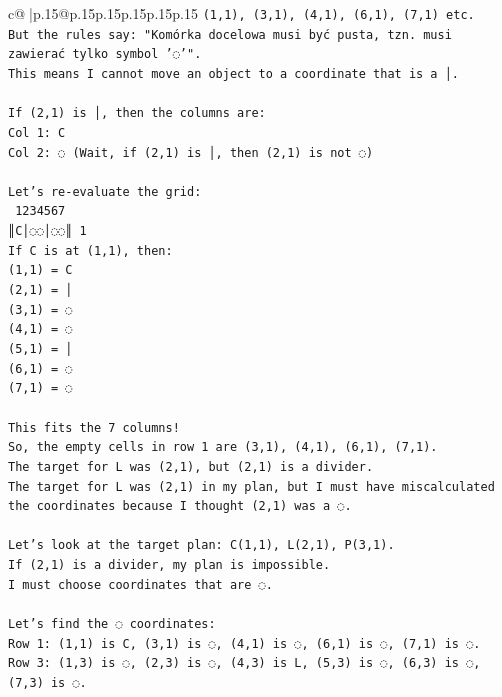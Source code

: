 \documentclass{article}
\begin{document}
{\begin{supertabular}{c@{$\;$}|p{.15\linewidth}@{}p{.15\linewidth}p{.15\linewidth}p{.15\linewidth}p{.15\linewidth}p{.15\linewidth}}
{{{\texttt{(1,1), (3,1), (4,1), (6,1), (7,1) etc.} \\
\texttt{But the rules say: "Komórka docelowa musi być pusta, tzn. musi zawierać tylko symbol '◌'".} \\
\texttt{This means I cannot move an object to a coordinate that is a │.} \\
\\ 
\texttt{If (2,1) is │, then the columns are:} \\
\texttt{Col 1: C} \\
\texttt{Col 2: ◌ (Wait, if (2,1) is │, then (2,1) is not ◌)} \\
\\ 
\texttt{Let's re{-}evaluate the grid:} \\
\texttt{ 1234567} \\
\texttt{║C│◌◌│◌◌║ 1} \\
\texttt{If C is at (1,1), then:} \\
\texttt{(1,1) = C} \\
\texttt{(2,1) = │} \\
\texttt{(3,1) = ◌} \\
\texttt{(4,1) = ◌} \\
\texttt{(5,1) = │} \\
\texttt{(6,1) = ◌} \\
\texttt{(7,1) = ◌} \\
\\ 
\texttt{This fits the 7 columns!} \\
\texttt{So, the empty cells in row 1 are (3,1), (4,1), (6,1), (7,1).} \\
\texttt{The target for L was (2,1), but (2,1) is a divider.} \\
\texttt{The target for L was (2,1) in my plan, but I must have miscalculated the coordinates because I thought (2,1) was a ◌.} \\
\\ 
\texttt{Let's look at the target plan: C(1,1), L(2,1), P(3,1).} \\
\texttt{If (2,1) is a divider, my plan is impossible.} \\
\texttt{I must choose coordinates that are ◌.} \\
\\ 
\texttt{Let's find the ◌ coordinates:} \\
\texttt{Row 1: (1,1) is C, (3,1) is ◌, (4,1) is ◌, (6,1) is ◌, (7,1) is ◌.} \\
\texttt{Row 3: (1,3) is ◌, (2,3) is ◌, (4,3) is L, (5,3) is ◌, (6,3) is ◌, (7,3) is ◌.} \\
}}}
\end{supertabular}}
\end{document}
